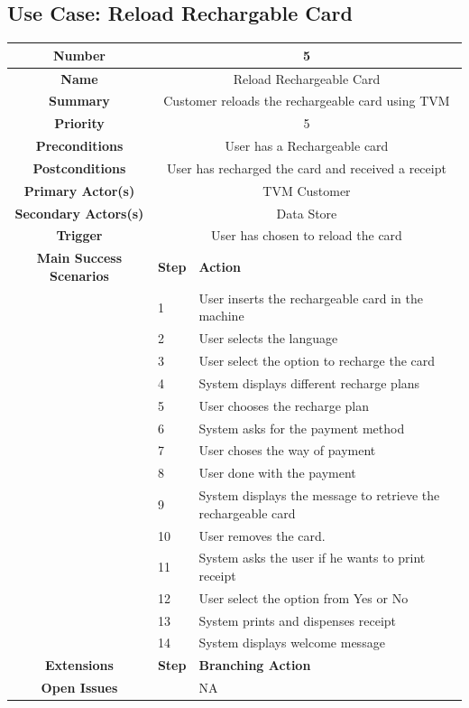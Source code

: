 \documentclass[a4paper,12pt]{report}
\begin{document}
\subsection{Use Case: Reload Rechargable Card}
\begin{tabular}{ | c | p{2cm} | p{7cm} |}
	
	\hline
	\textbf{Number} & \multicolumn{2}{c|}{5}  \\
	\hline
	\textbf{Name} & \multicolumn{2}{c|}{Reload Rechargeable Card}  \\
	\hline
	\textbf{Summary} & \multicolumn{2}{c|}{Customer reloads the rechargeable card using TVM}  \\
	\hline
	\textbf{Priority} & \multicolumn{2}{c|}{5}  \\
	\hline
	\textbf{Preconditions} & \multicolumn{2}{c|}{User has a Rechargeable card}  \\
	\hline
	\textbf{Postconditions} & \multicolumn{2}{c|}{User has recharged the card and received a receipt}  \\
	\hline
	\textbf{Primary Actor(s)} & \multicolumn{2}{c|}{TVM Customer}  \\
	\hline
	\textbf{Secondary Actors(s)} & \multicolumn{2}{c|}{Data Store}  \\
	\hline
	\textbf{Trigger} & \multicolumn{2}{c|}{User has chosen to reload the card}  \\
	\hline
	\textbf{Main Success Scenarios} & \textbf{Step} & \textbf{Action} \\
	\hline
	& 1 & User inserts the rechargeable card in the machine \\ 
	\hline
	&  2  & User selects the language \\
	\hline
	&  3  & User select the option to recharge the card \\
	\hline
	&  4  & System displays different recharge plans \\
	\hline
	&  5  & User chooses the recharge plan \\
	\hline
	&  6  & System asks for the payment method \\
	\hline
	&  7  & User choses the way of payment \\
	\hline
	&  8  & User done with the payment \\
	\hline
	&  9  & System displays the message to retrieve the rechargeable card \\
	\hline
	&  10  & User removes the card. \\
	\hline
	&  11  & System asks the user if he wants to print receipt \\
	\hline
	&  12  & User select the option from Yes or No \\
	\hline
	&  13  & System prints and dispenses receipt \\
	\hline
	&  14  & System displays welcome message \\
	\hline
	
	\textbf{Extensions} & \textbf{Step} & \textbf{Branching Action} \\
	\hline
	\textbf{Open Issues} &    & NA \\
	\hline
	
\end{tabular}
\end{document}
